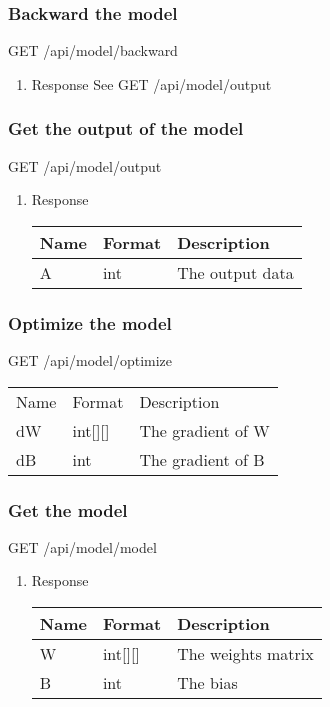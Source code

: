 \documentclass[11pt]{article}
\begin{document}
\subsubsection{Backward the model}
\label{sec:org37d6cdd}
GET /api/model/backward
\begin{enumerate}
\item Response
\label{sec:orgb191206}
See GET /api/model/output
\end{enumerate}
\subsubsection{Get the output of the model}
\label{sec:orgcd52544}
GET /api/model/output
\begin{enumerate}
\item Response
\label{sec:org509b09b}
\begin{center}
\begin{tabular}{lll}
Name & Format & Description\\
\hline
A & int & The output data\\
\end{tabular}
\end{center}
\end{enumerate}
\subsubsection{Optimize the model}
\label{sec:org4572f28}
GET /api/model/optimize
\begin{center}
\begin{tabular}{lll}
Name & Format & Description\\
dW & int[][] & The gradient of W\\
dB & int & The gradient of B\\
\end{tabular}
\end{center}
\subsubsection{Get the model}
\label{sec:org27d0729}
GET /api/model/model
\begin{enumerate}
\item Response
\label{sec:org5e5420a}
\begin{center}
\begin{tabular}{lll}
Name & Format & Description\\
\hline
W & int[][] & The weights matrix\\
B & int & The bias\\
\end{tabular}
\end{center}
\end{enumerate}
\end{document}

